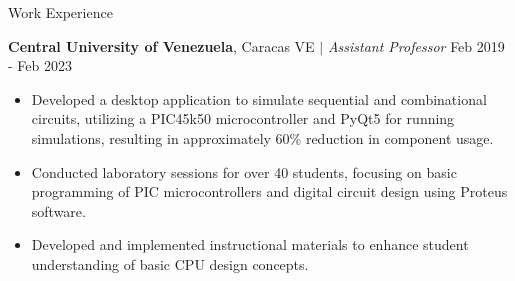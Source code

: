 \documentclass{resume} %
\begin{document}
\begin{rSection}{Work Experience}
\begin{itemize}
    
        
    \end{itemize}


    \textbf{Central University of Venezuela}, Caracas VE $\mid$ \textit{Assistant Professor} \hfill Feb 2019 - Feb 2023   
    
    \begin{itemize}
        \item Developed a desktop application to simulate sequential and combinational circuits, utilizing a PIC45k50 microcontroller and PyQt5 for running simulations, resulting in approximately 60\% reduction in component usage.
        
        \item Conducted laboratory sessions for over 40 students, focusing on basic programming of PIC microcontrollers and digital circuit design using Proteus software.
        
        \item Developed and implemented instructional materials to enhance student understanding of basic CPU design concepts.
    
        
    \end{itemize}



\end{rSection}
\end{document}
